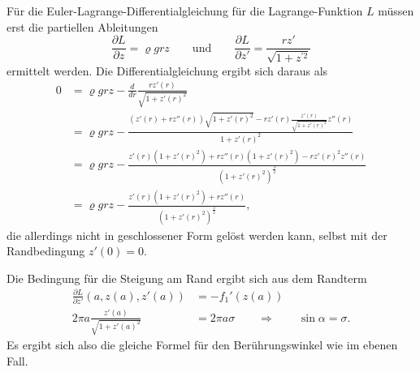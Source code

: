 Für die Euler-Lagrange-Differentialgleichung für die Lagrange-Funktion $L$
müssen erst die partiellen Ableitungen
\[
\frac{\partial L}{\partial z}
=
\varrho g r z
\qquad\text{und}\qquad
\frac{\partial L}{\partial z'}
=
\frac{rz'}{\sqrt{1+z^{\prime 2}}}
\]
ermittelt werden.
Die Differentialgleichung ergibt sich daraus als
\begin{align*}
0
&=
\varrho grz
-
\frac{d}{dr}
\frac{rz'(r)}{\sqrt{1+z'(r)^2}}
\\
&=
\varrho grz
-
\frac{
\displaystyle
(z'(r)+rz''(r))\sqrt{1+z'(r)^2}
-
rz'(r)\frac{z'(r)}{\sqrt{1+z'(r)^2}}z''(r)
}{
1+z'(r)^2
}
\\
&=
\varrho grz
-
\frac{
z'(r)(1+z'(r)^2)
+
rz''(r)(1+z'(r)^2)
-
rz'(r)^2z''(r)
}{
(1+z'(r)^2)^{\frac32}
}
\\
&=
\varrho grz
-
\frac{
z'(r)(1+z'(r)^2)
+
rz''(r)
}{
(1+z'(r)^2)^{\frac32}
},
\end{align*}
die allerdings nicht in geschlossener Form gelöst werden kann, selbst
mit der Randbedingung $z'(0)=0$.

Die Bedingung für die Steigung am Rand ergibt sich aus dem Randterm
\begin{align*}
\frac{\partial L}{\partial z'}(a, z(a), z'(a))
&=
-
f_1'(z(a))
\\
2\pi a
\frac{z'(a)}{\sqrt{1+z'(a)^2}}
&=
2\pi a \sigma
\qquad\Rightarrow\qquad
\sin\alpha = \sigma.
\end{align*}
Es ergibt sich also die gleiche Formel für den Berührungswinkel wie
im ebenen Fall.




